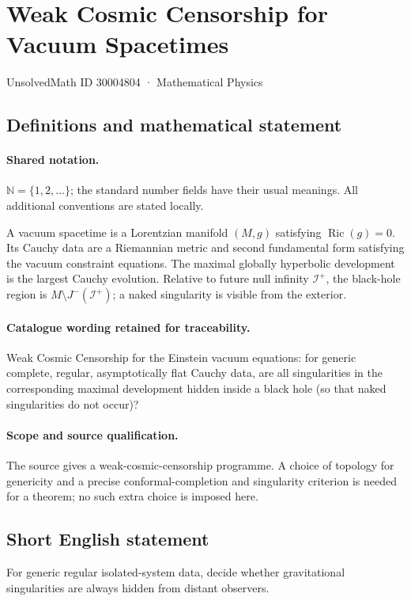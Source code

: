 \documentclass[11pt]{article}
\begin{document}
\setcounter{section}{30004803}
\section{Weak Cosmic Censorship for Vacuum Spacetimes}\label{30004804}
{\small UnsolvedMath ID 30004804 · Mathematical Physics}
\subsection{Definitions and mathematical statement}

\paragraph{Shared notation.}$\mathbb N=\{1,2,\ldots\}$; the standard number fields have their usual meanings. All additional conventions are stated locally.


A vacuum spacetime is a Lorentzian manifold $(M,g)$ satisfying $\operatorname{Ric}(g)=0$. Its Cauchy data are a Riemannian metric and second fundamental form satisfying the vacuum constraint equations. The maximal globally hyperbolic development is the largest Cauchy evolution. Relative to future null infinity $\mathcal I^+$, the black-hole region is $M\setminus J^-(\mathcal I^+)$; a naked singularity is visible from the exterior.

\paragraph{Catalogue wording retained for traceability.}
Weak Cosmic Censorship for the Einstein vacuum equations: for generic complete, regular, asymptotically flat Cauchy data, are all singularities in the corresponding maximal development hidden inside a black hole (so that naked singularities do not occur)?

\paragraph{Scope and source qualification.}The source gives a weak-cosmic-censorship programme. A choice of topology for genericity and a precise conformal-completion and singularity criterion is needed for a theorem; no such extra choice is imposed here.
\subsection{Short English statement}
For generic regular isolated-system data, decide whether gravitational singularities are always hidden from distant observers.
\end{document}
